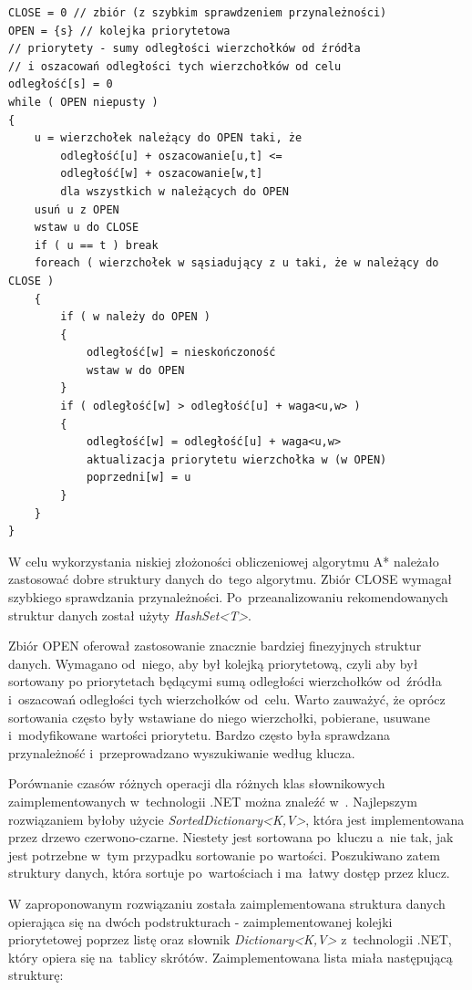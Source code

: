 \documentclass[a4paper,11pt,twoside,openright]{report}
\theoremstyle{definition}
\begin{document}
\begin{verbatim}
CLOSE = 0 // zbiór (z szybkim sprawdzeniem przynależności)
OPEN = {s} // kolejka priorytetowa
// priorytety - sumy odległości wierzchołków od źródła
// i oszacowań odległości tych wierzchołków od celu
odległość[s] = 0
while ( OPEN niepusty )
{
    u = wierzchołek należący do OPEN taki, że
        odległość[u] + oszacowanie[u,t] <=
        odległość[w] + oszacowanie[w,t]
        dla wszystkich w należących do OPEN
    usuń u z OPEN
    wstaw u do CLOSE
    if ( u == t ) break
    foreach ( wierzchołek w sąsiadujący z u taki, że w należący do CLOSE )
    {
        if ( w należy do OPEN )
        {
            odległość[w] = nieskończoność
            wstaw w do OPEN
        }
        if ( odległość[w] > odległość[u] + waga<u,w> )
        {
            odległość[w] = odległość[u] + waga<u,w>
            aktualizacja priorytetu wierzchołka w (w OPEN)
            poprzedni[w] = u
        }
    }
}
\end{verbatim}

W celu wykorzystania niskiej złożoności obliczeniowej algorytmu A*
należało zastosować dobre struktury danych do~tego algorytmu. Zbiór CLOSE
wymagał szybkiego sprawdzania przynależności. Po~przeanalizowaniu rekomendowanych
struktur danych \cite{Dotnet struktury} został użyty \textit{HashSet<T>}.

Zbiór OPEN oferował zastosowanie znacznie bardziej finezyjnych struktur danych.
Wymagano od~niego, aby był kolejką priorytetową, czyli aby był sortowany po
priorytetach będącymi sumą odległości wierzchołków od~źródła i~oszacowań odległości
tych wierzchołków od~celu. Warto zauważyć, że oprócz sortowania często były wstawiane
do niego wierzchołki, pobierane, usuwane i~modyfikowane wartości priorytetu.
Bardzo często była sprawdzana przynależność i~przeprowadzano
wyszukiwanie według klucza.

Porównanie czasów różnych operacji dla różnych klas słownikowych zaimplementowanych
w~technologii .NET można znaleźć w~\cite{C w pigulce}.
Najlepszym rozwiązaniem byłoby użycie \textit{SortedDictionary<K,V>},
która jest implementowana przez drzewo czerwono-czarne. Niestety jest
sortowana po~kluczu a~nie tak, jak jest potrzebne w~tym przypadku sortowanie
po wartości. Poszukiwano zatem struktury danych, która sortuje po~wartościach
i ma~łatwy dostęp przez klucz.

W zaproponowanym rozwiązaniu została zaimplementowana struktura danych opierająca się
na dwóch podstrukturach - zaimplementowanej kolejki priorytetowej poprzez listę
oraz słownik \textit{Dictionary<K,V>} z~technologii .NET, który opiera się na~tablicy
skrótów. Zaimplementowana lista miała następującą strukturę:
\end{document}
